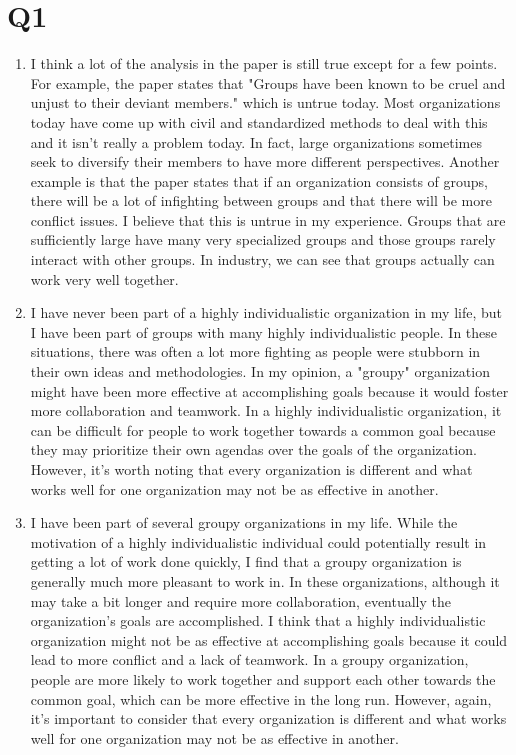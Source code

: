 \documentclass[12pt, letterpaper, titlepage]{article}
\begin{document}
 
\singlespacing
\section*{Q1}
\begin{enumerate}
    \item I think a lot of the analysis in the paper is still true except for a few points. For example, the paper states that "Groups have been known to be cruel and unjust to their deviant members." which is untrue today. Most organizations today have come up with civil and standardized methods to deal with this and it isn't really a problem today. In fact, large organizations sometimes seek to diversify their members to have more different perspectives. Another example is that the paper states that if an organization consists of groups, there will be a lot of infighting between groups and that there will be more conflict issues. I believe that this is untrue in my experience. Groups that are sufficiently large have many very specialized groups and those groups rarely interact with other groups. In industry, we can see that groups actually can work very well together.
    \item I have never been part of a highly individualistic organization in my life, but I have been part of groups with many highly individualistic people. In these situations, there was often a lot more fighting as people were stubborn in their own ideas and methodologies. In my opinion, a "groupy" organization might have been more effective at accomplishing goals because it would foster more collaboration and teamwork. In a highly individualistic organization, it can be difficult for people to work together towards a common goal because they may prioritize their own agendas over the goals of the organization. However, it's worth noting that every organization is different and what works well for one organization may not be as effective in another.
    \item I have been part of several groupy organizations in my life. While the motivation of a highly individualistic individual could potentially result in getting a lot of work done quickly, I find that a groupy organization is generally much more pleasant to work in. In these organizations, although it may take a bit longer and require more collaboration, eventually the organization's goals are accomplished. I think that a highly individualistic organization might not be as effective at accomplishing goals because it could lead to more conflict and a lack of teamwork. In a groupy organization, people are more likely to work together and support each other towards the common goal, which can be more effective in the long run. However, again, it's important to consider that every organization is different and what works well for one organization may not be as effective in another.

\end{enumerate}
\end{document}
